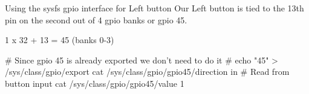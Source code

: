\begin{frame}
   {Using the sysfs gpio interface for Left button}
Our Left button is tied to the 13th pin on the second out of 4 gpio banks or gpio 45.

1 x 32 + 13 = 45 (banks 0-3)
   \begin{raw}
# Since gpio 45 is already exported we don't need to do it
# echo "45" > /sys/class/gpio/export
cat /sys/class/gpio/gpio45/direction
in
# Read from button input
cat /sys/class/gpio/gpio45/value
1
   \end{raw}
\end{frame}

\cprotect\note{


}


